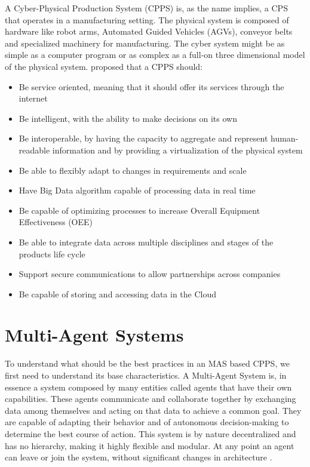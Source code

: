 A Cyber-Physical Production System (CPPS) is, as the name implies, a CPS that operates in a manufacturing setting. The physical system is composed of hardware like robot arms, Automated Guided Vehicles (AGVs), conveyor belts and specialized machinery for manufacturing. The cyber system might be as simple as a computer program or as complex as a full-on three dimensional model of the physical system. \citeauthor{birgit01} \cite{birgit01} proposed that a CPPS should:
\begin{itemize}
	\item Be service oriented, meaning that it should offer its services through the internet
	\item Be intelligent, with the ability to make decisions on its own
	\item Be interoperable, by having the capacity to aggregate and represent human-readable information and by providing a virtualization of the physical system
	\item Be able to flexibly adapt to changes in requirements and scale
	\item Have Big Data algorithm capable of processing data in real time
	\item Be capable of optimizing processes to increase Overall Equipment Effectiveness (OEE)
	\item Be able to integrate data across multiple disciplines and stages of the products life cycle
	\item Support secure communications to allow partnerships across companies
	\item Be capable of storing and accessing data in the Cloud
\end{itemize}

\section{Multi-Agent Systems}
\label{sec:multi-agent_systems}


To understand what should be the best practices in an MAS based CPPS, we first need to understand its base characteristics. A Multi-Agent System is, in essence a system composed by many entities called agents that have their own capabilities. These agents communicate and collaborate together by exchanging data among themselves and acting on that data to achieve a common goal. They are capable of adapting their behavior and of autonomous decision-making to determine the best course of action. This system is by nature decentralized and has no hierarchy, making it highly flexible and modular. At any point an agent can leave or join the system, without significant changes in architecture \cite{paulo02}.\\

